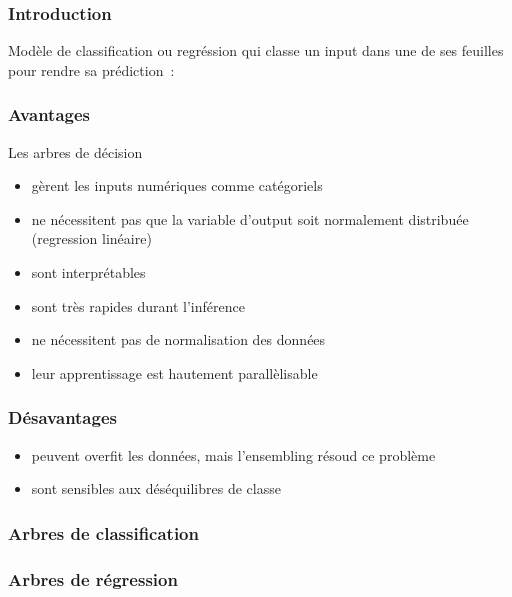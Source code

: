 \begin{frame}
  \frametitle{Introduction}
  Modèle de classification ou regréssion qui classe un input dans une
  de ses feuilles pour rendre sa prédiction :
\end{frame}

\begin{frame}
  \frametitle{Avantages}
  Les arbres de décision
  \begin{itemize}[<+->]
  \item gèrent les inputs numériques comme catégoriels
  \item ne nécessitent pas que la variable d'output soit normalement
    distribuée (regression linéaire)
  \item sont interprétables
  \item sont très rapides durant l'inférence
  \item ne nécessitent pas de normalisation des données
  \item leur apprentissage est hautement parallèlisable
  \end{itemize}
\end{frame}

\begin{frame}
  \frametitle{Désavantages}
  \begin{itemize}[<+->]
  \item peuvent overfit les données, mais l'ensembling résoud ce
    problème
  \item sont sensibles aux déséquilibres de classe
  \end{itemize}
\end{frame}

\begin{frame}
  \frametitle{Arbres de classification}
\end{frame}

\begin{frame}
  \frametitle{Arbres de régression}
\end{frame}

